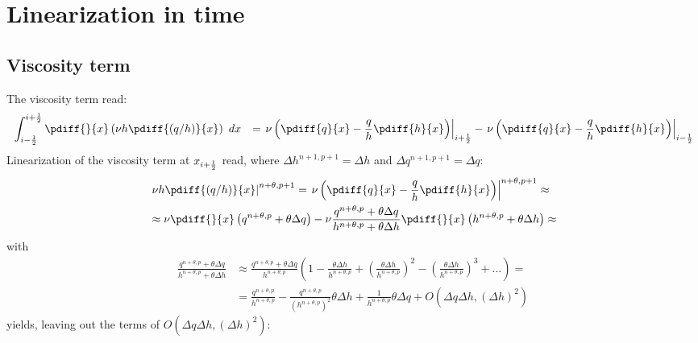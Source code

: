 \chapter{Linearization in time}
\section{Viscosity term}\label{sec:linearisation_viscosity}
The viscosity term read:
\begin{align}
    &  \int^{i+\half}_{i-\half}\pdiff{}{x} \left( \nu h \pdiff{(q/h)}{x} \right)\ dx & =
    \left. \nu \left( \pdiff{q}{x} - \frac{q}{h} \pdiff{h}{x} \right) \right|_{i+\half} - \left. \nu \left( \pdiff{q}{x} - \frac{q}{h} \pdiff{h}{x} \right) \right|_{i-\half}
\end{align}
Linearization of the viscosity term at $x_{i+\frac{1}{2}}$ read, where $\Delta h^{n+1, p+1} = \Delta h$ and  $\Delta q^{n+1, p+1} = \Delta q$:
\begin{align}
    &\left. \nu h \pdiff{(q/h)}{x} \right|^{n+\theta, p+1}  = \left. \nu \left(\pdiff{q}{x} - \frac{q}{h} \pdiff{h}{x} \right) \right|^{n+\theta, p+1} \approx
    \\
    & \approx \nu \pdiff{}{x} \left( q^{n+\theta, p} + \theta \Delta q \right)
    - \nu \frac{q^{n+\theta, p} + \theta \Delta q}{h^{n+\theta, p} + \theta \Delta h} \pdiff{}{x} \left( h^{n+\theta, p} + \theta \Delta h  \right) \approx
\end{align}
with
\begin{align}
    \frac{q^{n+\theta, p} + \theta \Delta q}{h^{n+\theta, p} + \theta \Delta h}
    & \approx \frac{q^{n+\theta, p} + \theta \Delta q}{h^{n+\theta, p}}\left( 1 - \frac{\theta\Delta h}{h^{n+\theta, p}} +
    \left( \frac{\theta\Delta h}{h^{n+\theta, p}}  \right)^2 - \left( \frac{\theta\Delta h}{h^{n+\theta, p}}  \right)^3 + \ldots \right) =
    \\
    & =
    \frac{q^{n+\theta, p}}{h^{n+\theta, p}} - \frac{q^{n+\theta, p}}{(h^{n+\theta, p})^2}\theta\Delta h + \frac{1}{h^{n+\theta, p}}\theta \Delta q  + O\left( \Delta q\Delta h, \left(\Delta h\right)^2 \right)
\end{align}
yields, leaving out the terms of $O\left( \Delta q\Delta h, \left(\Delta h\right)^2 \right)$:
